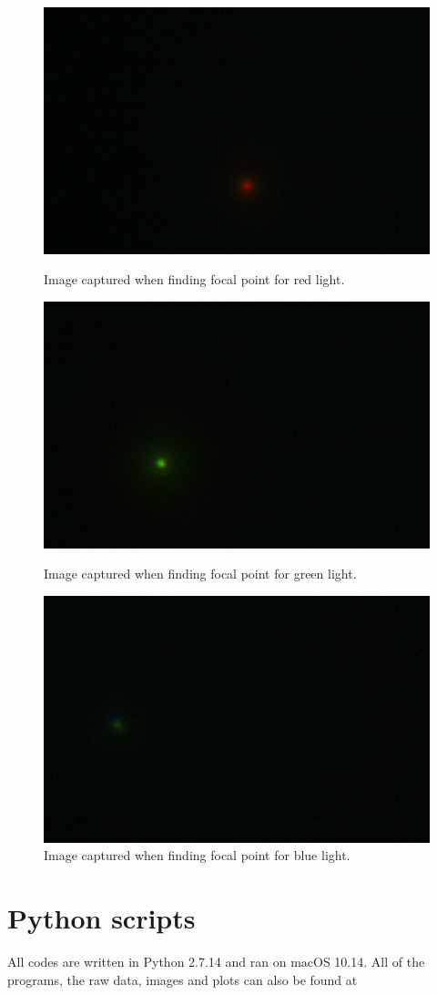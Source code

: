 \documentclass{emulateapj}
\begin{document}
\begin{appendices}
\begin{figure}[h!]
	\begin{minipage}{.33\textwidth}
	\centering
	\includegraphics[width=0.7\linewidth]{./images/ex2/cali_red.pdf}
	\caption{Image captured when finding focal point for red light.}
	\end{minipage}%
	\begin{minipage}{.33\textwidth}
	\centering
	\includegraphics[width=0.55\linewidth]{./images/ex2/cali_green.pdf}
		\caption{Image captured when finding focal point for green light.}
	\end{minipage}%
	\begin{minipage}{.33\textwidth}
	\centering
	\includegraphics[width=0.6\linewidth]{./images/ex2/cali_blue.pdf}
		\caption{Image captured when finding focal point for blue light.}
	\end{minipage}
\end{figure}
\clearpage

\section{Python scripts}
\label{asec: Python scripts}
All codes are written in Python 2.7.14 and ran on macOS 10.14. All of the programs, the raw data, images and plots can also be found at 

\end{appendices}
\end{document}
